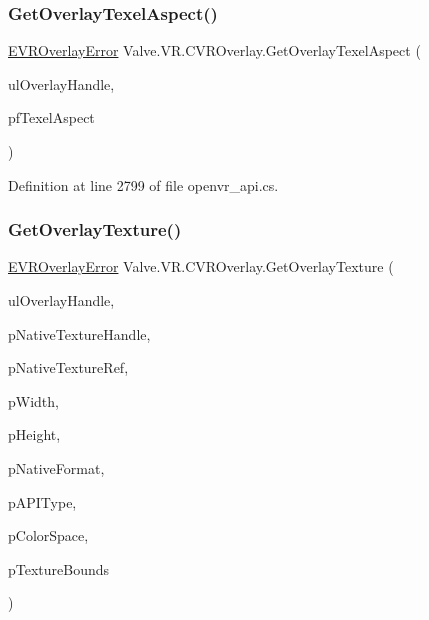 \subsubsection{\texorpdfstring{GetOverlayTexelAspect()}{GetOverlayTexelAspect()}}
{\footnotesize\ttfamily \mbox{\hyperlink{namespace_valve_1_1_v_r_aaee5c5144f42b7969d45b854f51b0c18}{E\+V\+R\+Overlay\+Error}} Valve.\+V\+R.\+C\+V\+R\+Overlay.\+Get\+Overlay\+Texel\+Aspect (\begin{DoxyParamCaption}\item[{ulong}]{ul\+Overlay\+Handle,  }\item[{ref float}]{pf\+Texel\+Aspect }\end{DoxyParamCaption})}



Definition at line 2799 of file openvr\+\_\+api.\+cs.

\mbox{\label{class_valve_1_1_v_r_1_1_c_v_r_overlay_a9a45ac264cc0959968883880b3e7231b}} 
\subsubsection{\texorpdfstring{GetOverlayTexture()}{GetOverlayTexture()}}
{\footnotesize\ttfamily \mbox{\hyperlink{namespace_valve_1_1_v_r_aaee5c5144f42b7969d45b854f51b0c18}{E\+V\+R\+Overlay\+Error}} Valve.\+V\+R.\+C\+V\+R\+Overlay.\+Get\+Overlay\+Texture (\begin{DoxyParamCaption}\item[{ulong}]{ul\+Overlay\+Handle,  }\item[{ref Int\+Ptr}]{p\+Native\+Texture\+Handle,  }\item[{Int\+Ptr}]{p\+Native\+Texture\+Ref,  }\item[{ref uint}]{p\+Width,  }\item[{ref uint}]{p\+Height,  }\item[{ref uint}]{p\+Native\+Format,  }\item[{ref \mbox{\hyperlink{namespace_valve_1_1_v_r_a9481de640e411eef49c2f3fdca82eaa3}{E\+Texture\+Type}}}]{p\+A\+P\+I\+Type,  }\item[{ref \mbox{\hyperlink{namespace_valve_1_1_v_r_aeb0fba37ba28d8ca276d7c10f01809ac}{E\+Color\+Space}}}]{p\+Color\+Space,  }\item[{ref \mbox{\hyperlink{struct_valve_1_1_v_r_1_1_v_r_texture_bounds__t}{V\+R\+Texture\+Bounds\+\_\+t}}}]{p\+Texture\+Bounds }\end{DoxyParamCaption})}



